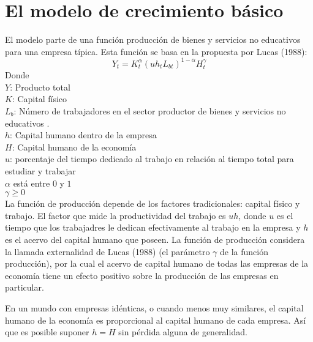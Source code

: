 \documentclass[12pt,a4paper]{report}
\begin{document}
	\chapter{El modelo de crecimiento básico}
	El modelo parte de una función producción de bienes y servicios no educativos para una empresa típica. Esta función se basa en la propuesta por Lucas (1988):
	\begin{equation}\label{ecu1}
		Y_t=K_t^\alpha(uh_tL_{bt})^{1-\alpha}H_t^\gamma
	\end{equation}
	Donde  \\
	\hspace*{0.7cm}$Y$: Producto total\\
	\hspace*{0.7cm}$K$: Capital físico\\
	\hspace*{0.7cm}$L_b$: Número de trabajadores en el sector productor de bienes y servicios no educativos .\\
	\hspace*{0.7cm}$h$: Capital humano dentro de la empresa\\ 
	\hspace*{0.7cm}$H$: Capital humano de la economía\\
	\hspace*{0.7cm}$u$: porcentaje del tiempo dedicado al trabajo en relación al tiempo total para estudiar y trabajar\\ 
	\hspace*{0.7cm}$\alpha$ está entre $0$ y $1$\\
	\hspace*{0.7cm}$\gamma\geq 0$ \\
	La función de producción depende de los factores tradicionales: capital físico y trabajo. El factor que mide la productividad del trabajo es $uh$, donde $u$ es el tiempo que los trabajadres le dedican efectivamente al trabajo en la empresa y $h$ es el acervo del capital humano que poseen. La función de producción considera la llamada externalidad de Lucas (1988) (el parámetro $\gamma$ de la función producción), por la cual el acervo de capital humano de todas las empresas de la economía tiene un efecto positivo sobre la producción de las empresas en particular.
	
	En un mundo con empresas idénticas, o cuando menos muy similares, el capital humano de la economía es proporcional al capital humano de cada empresa. Así que es posible suponer $h=H$ sin pérdida alguna de generalidad.
	
\end{document}
